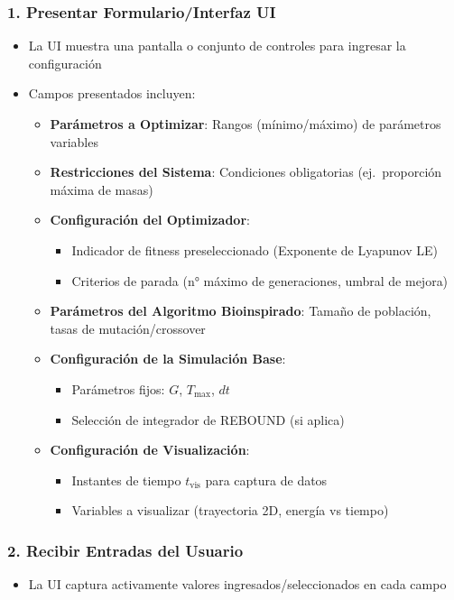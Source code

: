 \subsubsection*{1. Presentar Formulario/Interfaz UI}
\begin{itemize}
    \item La UI muestra una pantalla o conjunto de controles para ingresar la configuración
    \item Campos presentados incluyen:
    \begin{itemize}
        \item \textbf{Parámetros a Optimizar}: Rangos (mínimo/máximo) de parámetros variables
        \item \textbf{Restricciones del Sistema}: Condiciones obligatorias (ej.\ proporción máxima de masas)
        \item \textbf{Configuración del Optimizador}:
        \begin{itemize}
            \item Indicador de fitness preseleccionado (Exponente de Lyapunov \- LE)
            \item Criterios de parada (n° máximo de generaciones, umbral de mejora)
        \end{itemize}
        \item \textbf{Parámetros del Algoritmo Bioinspirado}: Tamaño de población, tasas de mutación/crossover
        \item \textbf{Configuración de la Simulación Base}:
        \begin{itemize}
            \item Parámetros fijos: $G$, $T_{\text{max}}$, $dt$
            \item Selección de integrador de REBOUND (si aplica)
        \end{itemize}
        \item \textbf{Configuración de Visualización}:
        \begin{itemize}
            \item Instantes de tiempo $t_{\text{vis}}$ para captura de datos
            \item Variables a visualizar (trayectoria 2D, energía vs tiempo)
        \end{itemize}
    \end{itemize}
\end{itemize}

\subsubsection*{2. Recibir Entradas del Usuario}
\begin{itemize}
    \item La UI captura activamente valores ingresados/seleccionados en cada campo
\end{itemize}

